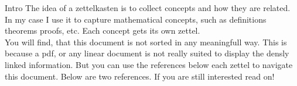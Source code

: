 \documentclass[class=article, crop=false]{standalone}
\begin{document}
\begin{zettel}{Intro}
The idea of a zettelkasten is to collect concepts and how they are related. In my case I use it to capture mathematical concepts, such as definitions theorems proofs, etc. Each concept gets its own zettel.\\

You will find, that this document is not sorted in any meaningfull way. This is because a pdf, or any linear document is not really suited to display the densly linked information. But you can use the references below each zettel to navigate this document.
Below are two references. If you are still interested read on!
\end{zettel}
\end{document}
